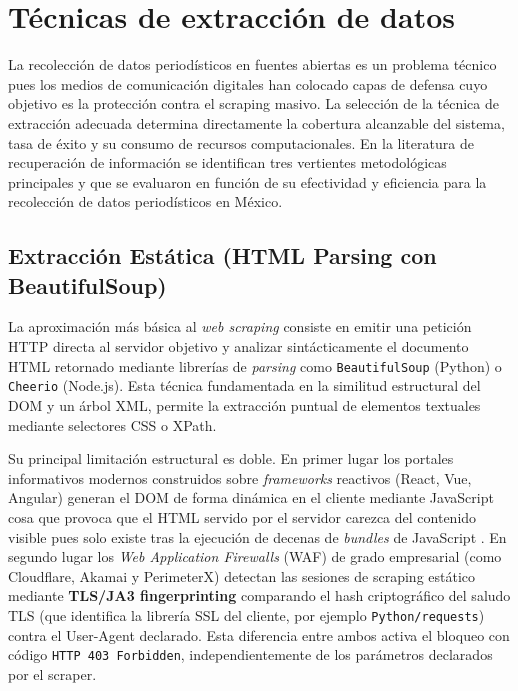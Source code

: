 \section{Técnicas de extracción de datos}
\label{sec:ea_tecnicas_extraccion}

La recolección de datos periodísticos en fuentes abiertas es un problema
técnico pues los medios de comunicación digitales han colocado capas de
defensa cuyo objetivo es la protección contra el scraping masivo. La selección de la técnica
de extracción adecuada determina directamente la cobertura alcanzable del sistema,
tasa de éxito y su consumo de recursos computacionales. En la literatura de
recuperación de información se identifican
tres vertientes metodológicas principales y que se evaluaron
en función de su efectividad y eficiencia para la recolección de datos
periodísticos en México. 

\subsection{Extracción Estática (HTML Parsing con BeautifulSoup)}
\label{subsec:ea_beautifulsoup}

La aproximación más básica al \textit{web scraping} consiste en emitir una
petición HTTP directa al servidor objetivo y analizar sintácticamente el documento
HTML retornado mediante librerías de \textit{parsing} como \texttt{BeautifulSoup}
(Python) o \texttt{Cheerio} (Node.js). Esta técnica  fundamentada en la similitud
estructural del DOM y un árbol XML, permite la extracción
puntual de elementos textuales mediante selectores CSS o XPath.

Su principal limitación estructural es doble. En primer lugar los portales
informativos modernos construidos sobre \textit{frameworks} reactivos (React,
Vue, Angular) generan el DOM de forma dinámica en el cliente mediante JavaScript 
cosa que provoca que el HTML servido por el servidor carezca del contenido visible pues
solo existe tras la ejecución de decenas de \textit{bundles} de JavaScript 
\cite{wu2022dynamic}.
En segundo lugar los \textit{Web Application Firewalls} (WAF) de grado empresarial
(como Cloudflare, Akamai y PerimeterX) detectan las sesiones de
scraping estático mediante \textbf{TLS/JA3 fingerprinting} comparando el hash
criptográfico del saludo TLS (que identifica la librería SSL del cliente, por ejemplo
\texttt{Python/requests}) contra el User-Agent declarado.
Esta diferencia entre ambos activa el bloqueo con código \texttt{HTTP 403 Forbidden},
independientemente de los parámetros declarados por el scraper.

